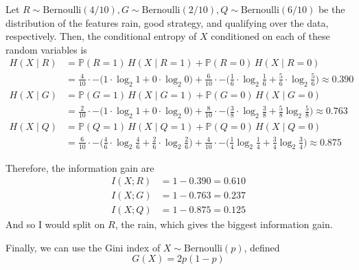 \begin{example}
    Let $R \sim \mathrm{Bernoulli}(4/10), G \sim \mathrm{Bernoulli}(2/10), Q \sim \mathrm{Bernoulli}(6/10)$ be the distribution of the features rain, good strategy, and qualifying over the data, respectively. Then, the conditional entropy of $X$ conditioned on each of these random variables is 
    \begin{align*}
      H(X \mid R) & = \mathbb{P}(R = 1)\, H(X \mid R = 1) + \mathbb{P}(R = 0) \, H(X \mid R = 0) \\
      & = \frac{4}{10} \cdot - \big( 1 \cdot \log_2 1 + 0 \cdot \log_2 0 \big) + \frac{6}{10} \cdot - \big( \frac{1}{6} \cdot \log_2 \frac{1}{6} + \frac{5}{6} \cdot \log_2 \frac{5}{6} \big) \approx 0.390 \\
      H(X \mid G) & =  \mathbb{P}(G = 1)\, H(X \mid G = 1) + \mathbb{P}(G = 0) \, H(X \mid G = 0) \\
      & = \frac{2}{10} \cdot - \big( 1 \cdot \log_2 1 + 0 \cdot \log_2 0 \big) + \frac{8}{10} \cdot - \big( \frac{3}{8} \cdot \log_2 \frac{3}{8} + \frac{5}{8} \log_2 \frac{5}{8} \big) \approx 0.763\\
      H(X \mid Q ) & = \mathbb{P}(Q = 1)\, H(X \mid Q = 1) + \mathbb{P}(Q = 0) \, H(X \mid Q = 0) \\
      & = \frac{6}{10} \cdot - \big( \frac{4}{6} \cdot \log_2 \frac{4}{6} + \frac{2}{6} \cdot \log_2 \frac{2}{6} \big) + \frac{4}{10} \cdot - \big( \frac{1}{4} \log_2 \frac{1}{4} + \frac{3}{4} \log_2 \frac{3}{4} \big) \approx 0.875
    \end{align*}

    Therefore, the information gain are 
    \begin{align*}
        I(X; R) & = 1 - 0.390 = 0.610 \\
        I(X; G) & = 1 - 0.763 = 0.237 \\
        I(X; Q) & = 1 - 0.875 = 0.125 
    \end{align*}
    And so I would split on $R$, the rain, which gives the biggest information gain. 
  \end{example}

  Finally, we can use the Gini index of $X \sim \mathrm{Bernoulli}(p)$, defined 
  \begin{equation}
    G(X) = 2 p (1 - p)
  \end{equation}

